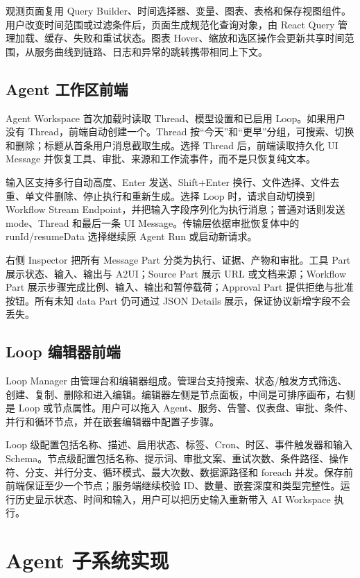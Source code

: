 \documentclass[conference,10pt]{IEEEtran}
\begin{document}
观测页面复用 Query Builder、时间选择器、变量、图表、表格和保存视图组件。用户改变时间范围或过滤条件后，页面生成规范化查询对象，由 React Query 管理加载、缓存、失败和重试状态。图表 Hover、缩放和选区操作会更新共享时间范围，从服务曲线到链路、日志和异常的跳转携带相同上下文。

\subsection{Agent 工作区前端}

Agent Workspace 首次加载时读取 Thread、模型设置和已启用 Loop。如果用户没有 Thread，前端自动创建一个。Thread 按“今天”和“更早”分组，可搜索、切换和删除；标题从首条用户消息截取生成。选择 Thread 后，前端读取持久化 UI Message 并恢复工具、审批、来源和工作流事件，而不是只恢复纯文本。

输入区支持多行自动高度、Enter 发送、Shift+Enter 换行、文件选择、文件去重、单文件删除、停止执行和重新生成。选择 Loop 时，请求自动切换到 Workflow Stream Endpoint，并把输入字段序列化为执行消息；普通对话则发送 mode、Thread 和最后一条 UI Message。传输层依据审批恢复体中的 runId/resumeData 选择继续原 Agent Run 或启动新请求。

右侧 Inspector 把所有 Message Part 分类为执行、证据、产物和审批。工具 Part 展示状态、输入、输出与 A2UI；Source Part 展示 URL 或文档来源；Workflow Part 展示步骤完成比例、输入、输出和暂停载荷；Approval Part 提供拒绝与批准按钮。所有未知 data Part 仍可通过 JSON Details 展示，保证协议新增字段不会丢失。

\subsection{Loop 编辑器前端}

Loop Manager 由管理台和编辑器组成。管理台支持搜索、状态/触发方式筛选、创建、复制、删除和进入编辑。编辑器左侧是节点面板，中间是可排序画布，右侧是 Loop 或节点属性。用户可以拖入 Agent、服务、告警、仪表盘、审批、条件、并行和循环节点，并在嵌套编辑器中配置子步骤。

Loop 级配置包括名称、描述、启用状态、标签、Cron、时区、事件触发器和输入 Schema。节点级配置包括名称、提示词、审批文案、重试次数、条件路径、操作符、分支、并行分支、循环模式、最大次数、数据源路径和 foreach 并发。保存前前端保证至少一个节点；服务端继续校验 ID、数量、嵌套深度和类型完整性。运行历史显示状态、时间和输入，用户可以把历史输入重新带入 AI Workspace 执行。

\section{Agent 子系统实现}
\end{document}
